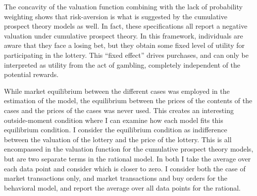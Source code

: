 \documentclass[12pt]{paper}
\begin{document}
The concavity of the valuation function combining with the lack of
probability weighting shows that risk-aversion is what is suggested by
the cumulative prospect theory models as well. In fact, these
specifications all report a negative valuation under cumulative
prospect theory. In this framework, individuals are aware that
they face a losing bet, but they obtain some fixed level of utility
for participating in the lottery. This ``fixed effect'' drives
purchases, and can only be interpreted as utility from the act of
gambling, completely independent of the potential rewards.

While market equilibrium between the different cases was employed in
the estimation of the model, the equilibrium between the prices of the
contents of the cases and the prices of the cases was never used. This
creates an interesting outside-moment condition where I can examine
how each model fits this equilibrium condition. I consider the
equilibrium condition as indifference between the valuation of the
lottery and the price of the lottery. This is all encompassed in the
valuation function for the cumulative prospect theory models, but are
two separate terms in the rational model. In both I take the average
over each data point and consider which is closer to zero. I consider
both the case of market transactions only, and market transactions and
buy orders for the behavioral model, and report the average over all
data points for the rational. 
\end{document}
